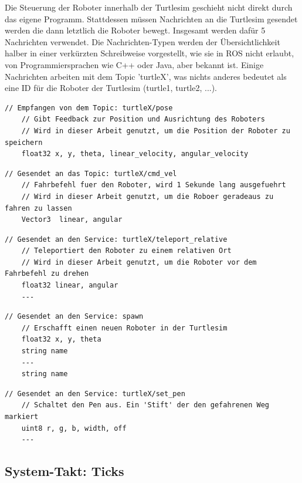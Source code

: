 Die Steuerung der Roboter innerhalb der Turtlesim geschieht nicht direkt durch das eigene Programm. Stattdessen müssen Nachrichten an die Turtlesim gesendet werden die dann letztlich die Roboter bewegt. Insgesamt werden dafür 5 Nachrichten verwendet. Die Nachrichten-Typen werden der Übersichtlichkeit halber in einer verkürzten Schreibweise vorgestellt, wie sie in ROS nicht erlaubt, von Programmiersprachen wie C++ oder Java, aber bekannt ist. Einige Nachrichten arbeiten mit dem Topic 'turtleX', was nichts anderes bedeutet als eine ID für die Roboter der Turtlesim (turtle1, turtle2, ...).

\begin{lstlisting}[style=ros, title=turtlesim/Pose.msg]
	// Empfangen von dem Topic: turtleX/pose
	// Gibt Feedback zur Position und Ausrichtung des Roboters
	// Wird in dieser Arbeit genutzt, um die Position der Roboter zu speichern
	float32 x, y, theta, linear_velocity, angular_velocity
\end{lstlisting}

\begin{lstlisting}[style=ros, title=geometry\_msgs/Twist.msg]
	// Gesendet an das Topic: turtleX/cmd_vel
	// Fahrbefehl fuer den Roboter, wird 1 Sekunde lang ausgefuehrt
	// Wird in dieser Arbeit genutzt, um die Roboer geradeaus zu fahren zu lassen
	Vector3  linear, angular
\end{lstlisting}

\begin{lstlisting}[style=ros, title=turtlesim/TeleportRelative Service]
	// Gesendet an den Service: turtleX/teleport_relative
	// Teleportiert den Roboter zu einem relativen Ort
	// Wird in dieser Arbeit genutzt, um die Roboter vor dem Fahrbefehl zu drehen
	float32 linear, angular
	---
\end{lstlisting}

\begin{lstlisting}[style=ros, title=turtlesim/Spawn Service]
	// Gesendet an den Service: spawn
	// Erschafft einen neuen Roboter in der Turtlesim
	float32 x, y, theta
	string name
	---
	string name
\end{lstlisting}

\begin{lstlisting}[style=ros, title=turtlesim/SetPen Service]
	// Gesendet an den Service: turtleX/set_pen
	// Schaltet den Pen aus. Ein 'Stift' der den gefahrenen Weg markiert
	uint8 r, g, b, width, off
	---
\end{lstlisting}

\subsection*{System-Takt: Ticks}

